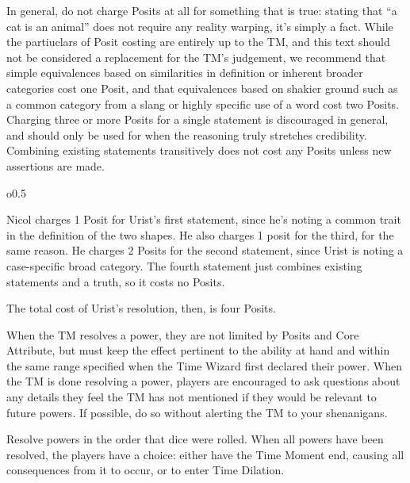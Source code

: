 \documentclass[twoside]{article}
\newenvironment{examplebox}[1]{\begin{tcolorbox}[colback=green!5!white,colframe=green!75!black,title={Example: #1}]}{\end{tcolorbox}\vspace{-30pt}}
\begin{document}
In general, do not charge Posits at all for something that is true: stating that ``a cat is an
animal'' does not require any reality warping, it's simply a fact. While the partiuclars of
Posit costing are entirely up to the TM, and this text should not be considered a replacement
for the TM's judgement, we recommend that simple equivalences based on similarities in
definition or inherent broader categories cost one Posit, and that equivalences based on shakier
ground such as a common category from a slang or highly specific use of a word cost two Posits. 
Charging three or more Posits for a single statement is discouraged in general, and should only
be used for when the reasoning truly stretches credibility. Combining existing statements
transitively does not cost any Posits unless new assertions are made.

\begin{wrapfigure}{o}{0.5\textwidth}
   \begin{examplebox}{Posit Costs}
      Nicol charges 1 Posit for Urist's first statement, since he's noting a common trait in the
      definition of the two shapes. He also charges 1 posit for the third, for the same reason.
      He charges 2 Posits for the second statement, since Urist is noting a case-specific broad
      category. The fourth statement just combines existing statements and a truth, so it costs
      no Posits.

      The total cost of Urist's resolution, then, is four Posits.
   \end{examplebox}
   \vspace{15pt}
\end{wrapfigure}

When the TM resolves a power, they are not limited by Posits and Core Attribute, but must keep
the effect pertinent to the ability at hand and within the same range specified when the Time
Wizard first declared their power. When the TM is done resolving a power, players are encouraged
to ask questions about any details they feel the TM has not mentioned if they would be relevant
to future powers. If possible, do so without alerting the TM to your shenanigans.

Resolve powers in the order that dice were rolled. When all powers have been resolved, the
players have a choice: either have the Time Moment end, causing all consequences from it to
occur, or to enter Time Dilation.
\end{document}
